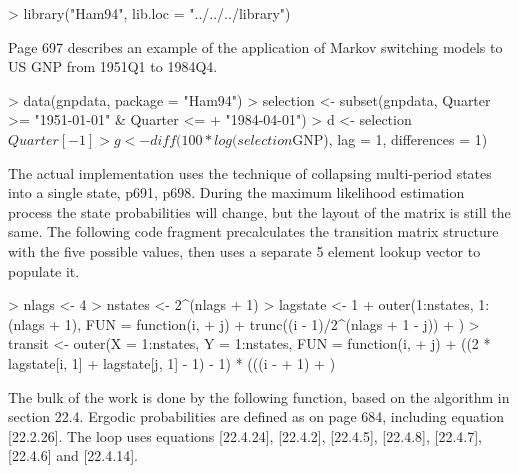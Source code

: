 \begin{Schunk}
\begin{Sinput}
> library("Ham94", lib.loc = "../../../library")
\end{Sinput}
\end{Schunk}
Page 697 describes an example of the application of Markov switching models to US GNP from 1951Q1 to 1984Q4.
\begin{Schunk}
\begin{Sinput}
> data(gnpdata, package = "Ham94")
> selection <- subset(gnpdata, Quarter >= "1951-01-01" & Quarter <= 
+     "1984-04-01")
> d <- selection$Quarter[-1]
> g <- diff(100 * log(selection$GNP), lag = 1, differences = 1)
\end{Sinput}
\end{Schunk}

The actual implementation uses the technique of collapsing multi-period states into a single state, p691, p698.
During the maximum likelihood estimation process the state probabilities will change, but the layout of the matrix
is still the same.  The following code fragment precalculates the transition matrix structure with the five possible
values, then uses a separate 5 element lookup vector to populate it.
\begin{Schunk}
\begin{Sinput}
> nlags <- 4
> nstates <- 2^(nlags + 1)
> lagstate <- 1 + outer(1:nstates, 1:(nlags + 1), FUN = function(i, 
+     j) {
+     trunc((i - 1)/2^(nlags + 1 - j))%
+ })
> transit <- outer(X = 1:nstates, Y = 1:nstates, FUN = function(i, 
+     j) {
+     ((2 * lagstate[i, 1] + lagstate[j, 1] - 1) - 1) * (((i - 
+         1)%
+ })
\end{Sinput}
\end{Schunk}
The bulk of the work is done by the following function, based on the algorithm in section 22.4.
Ergodic probabilities are defined as on page 684, including equation [22.2.26].
The loop uses equations [22.4.24], [22.4.2], [22.4.5], [22.4.8], [22.4.7], [22.4.6] and [22.4.14].
